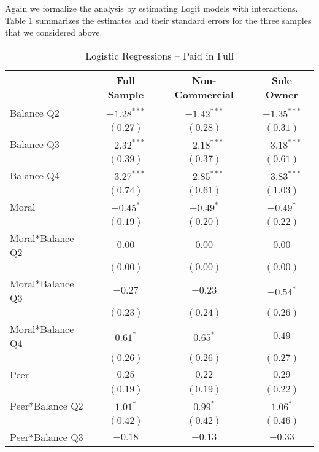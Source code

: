 \documentclass[12pt,titlepage]{article}
\begin{document}
Again we formalize the analysis by estimating Logit models with
interactions.  Table \ref{WW} summarizes the estimates and their
standard errors for the three samples that we considered
above.

\begin{table}[htbp]
\caption{Logistic Regressions -- Paid in Full}\label{WW}
{\footnotesize
\begin{center}
\begin{tabular}{l c c c }
\hline
                  & Full Sample & Non-Commercial & Sole Owner \\
\hline
Balance Q2        & $-1.28^{***}$ & $-1.42^{***}$ & $-1.35^{***}$ \\
                  & $(0.27)$      & $(0.28)$      & $(0.31)$      \\
Balance Q3        & $-2.32^{***}$ & $-2.18^{***}$ & $-3.18^{***}$ \\
                  & $(0.39)$      & $(0.37)$      & $(0.61)$      \\
Balance Q4        & $-3.27^{***}$ & $-2.85^{***}$ & $-3.83^{***}$ \\
                  & $(0.74)$      & $(0.61)$      & $(1.03)$      \\
Moral             & $-0.45^{*}$   & $-0.49^{*}$   & $-0.49^{*}$   \\
                  & $(0.19)$      & $(0.20)$      & $(0.22)$      \\
Moral*Balance Q2  & $0.00$        & $0.00$        & $0.00$        \\
                  & $(0.00)$      & $(0.00)$      & $(0.00)$      \\
Moral*Balance Q3  & $-0.27$       & $-0.23$       & $-0.54^{*}$   \\
                  & $(0.23)$      & $(0.24)$      & $(0.26)$      \\
Moral*Balance Q4  & $0.61^{*}$    & $0.65^{*}$    & $0.49$        \\
                  & $(0.26)$      & $(0.26)$      & $(0.27)$      \\
Peer              & $0.25$        & $0.22$        & $0.29$        \\
                  & $(0.19)$      & $(0.19)$      & $(0.22)$      \\
Peer*Balance Q2   & $1.01^{*}$    & $0.99^{*}$    & $1.06^{*}$    \\
                  & $(0.42)$      & $(0.42)$      & $(0.46)$      \\
Peer*Balance Q3   & $-0.18$       & $-0.13$       & $-0.33$       \\

\end{tabular}
\end{center}}
\end{table}
\end{document}
